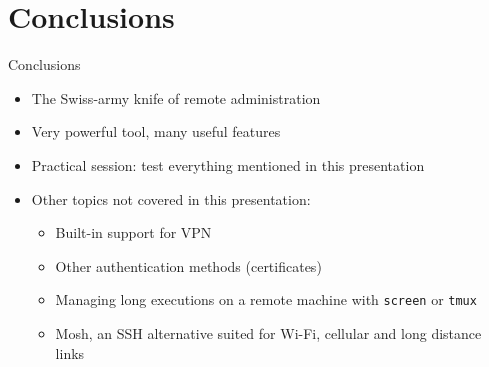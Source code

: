 \documentclass[11pt,final,usepdftitle=false]{beamer}
\begin{document}
\section{Conclusions}
\begin{frame}{Conclusions}
	\begin{itemize}
		\item The Swiss-army knife of remote administration
			\hbr
		\item Very powerful tool, many useful features
			\hbr
		\item Practical session: test everything mentioned in this presentation
			\hbr
		\item Other topics not covered in this presentation:
			\begin{itemize}
				\item Built-in support for VPN
					\hbr
				\item Other authentication methods (certificates)
					\hbr
				\item Managing long executions on a remote machine with \texttt{screen} or \texttt{tmux}
					\hbr
				\item Mosh, an SSH alternative suited for Wi-Fi, cellular and long distance links
			\end{itemize}
	\end{itemize}
\end{frame}
\end{document}
